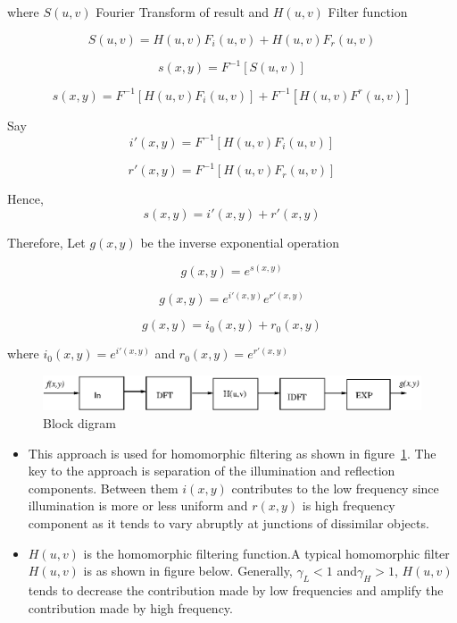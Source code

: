  where $S(u,v)$ Fourier Transform of result  and $H(u,v)$ Filter function

      \[S(u,v)=H(u,v)F_{i}(u,v)+H(u,v)F_{r}(u,v)\]

      \[s(x,y)=F^{-1}[S(u,v)]\]

      \[s(x,y)=F^{-1}[H(u,v)F_{i}(u,v)]+F^{-1}[H(u,v)F^{r}(u,v)]\]

      Say
      \[i'(x,y)=F^{-1}[H(u,v)F_{i}(u,v)]\]

       \[r'(x,y)=F^{-1}[H(u,v)F_{r}(u,v)]\]

       Hence,
       \[s(x,y)=i'(x,y)+r'(x,y)\]

       Therefore,
       Let $g(x,y)$ be the inverse exponential operation

       \[g(x,y)=e^{s(x,y)}\]

      \[g(x,y)=e^{i'(x,y)}e^{r'(x,y)}\]

       \[g(x,y)=i_{0}(x,y)+r_{0}(x,y)\]

       where $i_{0}(x,y)=e^{i'(x,y)}$ and $r_{0}(x,y)=e^{r'(x,y)}$



\begin{figure}[h]
	\centering
\includegraphics{blockdig.eps}
\caption{Block digram}
	\label{bbb}
\end{figure}

\begin{itemize}
\item This approach is used for homomorphic filtering as shown in figure~\ref{bbb}. The key to the approach is separation of the illumination and reflection components. Between them $i(x,y)$ contributes to the low frequency since illumination is more or less uniform and $r(x,y)$ is high frequency component as it tends to vary abruptly at junctions of dissimilar objects.
\item $H(u,v)$ is the homomorphic filtering function.A typical homomorphic filter $H(u,v)$ is as shown in figure below. Generally, $\gamma_L<1$ and$\gamma_H>1$, $H(u,v)$ tends to decrease the contribution made by low frequencies and amplify the contribution made by high frequency.
\end{itemize}


